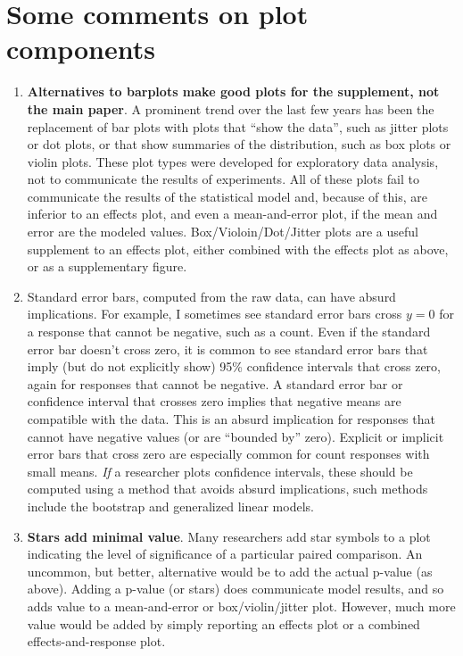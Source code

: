 \documentclass[]{book}
\providecommand{\tightlist}{%
  \setlength{\itemsep}{0pt}\setlength{\parskip}{0pt}}
\begin{document}
\hypertarget{some-comments-on-plot-components}{%
\section{Some comments on plot components}\label{some-comments-on-plot-components}}

\begin{enumerate}
\def\labelenumi{\arabic{enumi}.}
\tightlist
\item
  \textbf{Alternatives to barplots make good plots for the supplement, not the main paper}. A prominent trend over the last few years has been the replacement of bar plots with plots that ``show the data'', such as jitter plots or dot plots, or that show summaries of the distribution, such as box plots or violin plots. These plot types were developed for exploratory data analysis, not to communicate the results of experiments. All of these plots fail to communicate the results of the statistical model and, because of this, are inferior to an effects plot, and even a mean-and-error plot, if the mean and error are the modeled values. Box/Violoin/Dot/Jitter plots are a useful supplement to an effects plot, either combined with the effects plot as above, or as a supplementary figure.
\item
  Standard error bars, computed from the raw data, can have absurd implications. For example, I sometimes see standard error bars cross \(y=0\) for a response that cannot be negative, such as a count. Even if the standard error bar doesn't cross zero, it is common to see standard error bars that imply (but do not explicitly show) 95\% confidence intervals that cross zero, again for responses that cannot be negative. A standard error bar or confidence interval that crosses zero implies that negative means are compatible with the data. This is an absurd implication for responses that cannot have negative values (or are ``bounded by'' zero). Explicit or implicit error bars that cross zero are especially common for count responses with small means. \emph{If} a researcher plots confidence intervals, these should be computed using a method that avoids absurd implications, such methods include the bootstrap and generalized linear models.
\item
  \textbf{Stars add minimal value}. Many researchers add star symbols to a plot indicating the level of significance of a particular paired comparison. An uncommon, but better, alternative would be to add the actual p-value (as above). Adding a p-value (or stars) does communicate model results, and so adds value to a mean-and-error or box/violin/jitter plot. However, much more value would be added by simply reporting an effects plot or a combined effects-and-response plot.
\end{enumerate}
\end{document}
